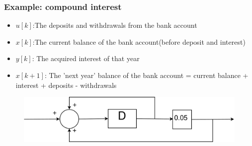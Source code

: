 \begin{frame}
	\frametitle{Example: compound interest}
	\begin{itemize}
			\item $ u[k]$:The deposits and withdrawals from the bank account
			\item $ x[k]$:The current balance of the bank account(before deposit and interest)
			\item $ y[k]$: The acquired interest of that year
			\item $ x[k+1]$: The 'next year' balance of the bank account  = current balance + interest + deposits - withdrawals
	\end{itemize}
	 \begin{figure}
			\centering
			\includegraphics[width=0.7\linewidth]{Images/Discrete_time_eps_14}
		\end{figure}

\end{frame}
%	
%

